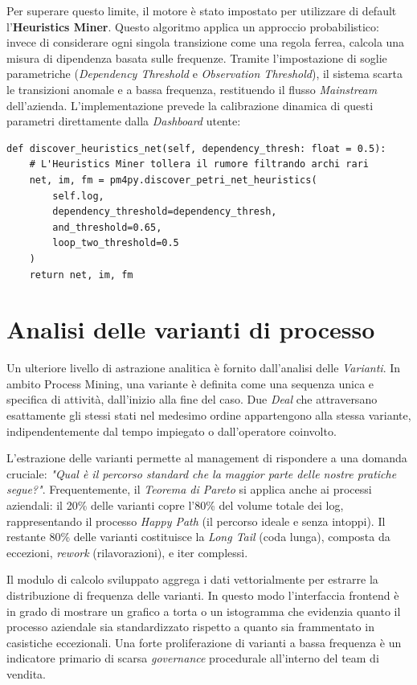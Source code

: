 \documentclass[12pt, a4paper]{report}
\begin{document}
Per superare questo limite, il motore è stato impostato per utilizzare di default l'\textbf{Heuristics Miner}. Questo algoritmo applica un approccio probabilistico: invece di considerare ogni singola transizione come una regola ferrea, calcola una misura di dipendenza basata sulle frequenze. Tramite l'impostazione di soglie parametriche (\textit{Dependency Threshold} e \textit{Observation Threshold}), il sistema scarta le transizioni anomale e a bassa frequenza, restituendo il flusso \textit{Mainstream} dell'azienda. L'implementazione prevede la calibrazione dinamica di questi parametri direttamente dalla \textit{Dashboard} utente:

\begin{verbatim}
def discover_heuristics_net(self, dependency_thresh: float = 0.5):
    # L'Heuristics Miner tollera il rumore filtrando archi rari
    net, im, fm = pm4py.discover_petri_net_heuristics(
        self.log,
        dependency_threshold=dependency_thresh,
        and_threshold=0.65,
        loop_two_threshold=0.5
    )
    return net, im, fm
\end{verbatim}

\section{Analisi delle varianti di processo}
Un ulteriore livello di astrazione analitica è fornito dall'analisi delle \textit{Varianti}. In ambito Process Mining, una variante è definita come una sequenza unica e specifica di attività, dall'inizio alla fine del caso. Due \textit{Deal} che attraversano esattamente gli stessi stati nel medesimo ordine appartengono alla stessa variante, indipendentemente dal tempo impiegato o dall'operatore coinvolto.

L'estrazione delle varianti permette al management di rispondere a una domanda cruciale: \textit{"Qual è il percorso standard che la maggior parte delle nostre pratiche segue?"}.
Frequentemente, il \textit{Teorema di Pareto} si applica anche ai processi aziendali: il 20\% delle varianti copre l'80\% del volume totale dei log, rappresentando il processo \textit{Happy Path} (il percorso ideale e senza intoppi). Il restante 80\% delle varianti costituisce la \textit{Long Tail} (coda lunga), composta da eccezioni, \textit{rework} (rilavorazioni), e iter complessi.

Il modulo di calcolo sviluppato aggrega i dati vettorialmente per estrarre la distribuzione di frequenza delle varianti. In questo modo l'interfaccia frontend è in grado di mostrare un grafico a torta o un istogramma che evidenzia quanto il processo aziendale sia standardizzato rispetto a quanto sia frammentato in casistiche eccezionali. Una forte proliferazione di varianti a bassa frequenza è un indicatore primario di scarsa \textit{governance} procedurale all'interno del team di vendita.
\end{document}
